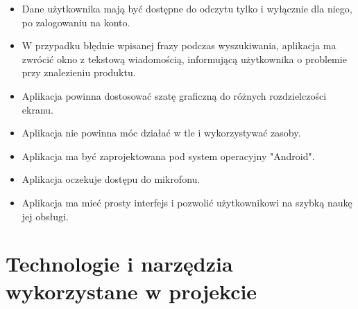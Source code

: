 \documentclass[12pt, a4paper]{article}
\begin{document}
\begin{sloppypar}
{{    \begin{itemize}
      \item Dane użytkownika mają być dostępne do odczytu tylko i wyłącznie dla niego, po 
      zalogowaniu na konto.
      \item W przypadku błędnie wpisanej frazy podczas wyszukiwania, aplikacja ma 
      zwrócić okno z tekstową wiadomością, informującą użytkownika o problemie przy
      znalezieniu produktu.
      \item Aplikacja powinna dostosować szatę graficzną do różnych rozdzielczości ekranu.
      \item Aplikacja nie powinna móc działać w tle i wykorzystywać zasoby.
      \item Aplikacja ma być zaprojektowana pod system operacyjny "Android".
      \item Aplikacja oczekuje dostępu do mikrofonu. 
      \item Aplikacja ma mieć prosty interfejs i pozwolić użytkownikowi na szybką naukę
      jej obsługi.
    \end{itemize}
  }
}
\section{Technologie i narzędzia wykorzystane w projekcie}
{
}
\end{sloppypar}
\end{document}
